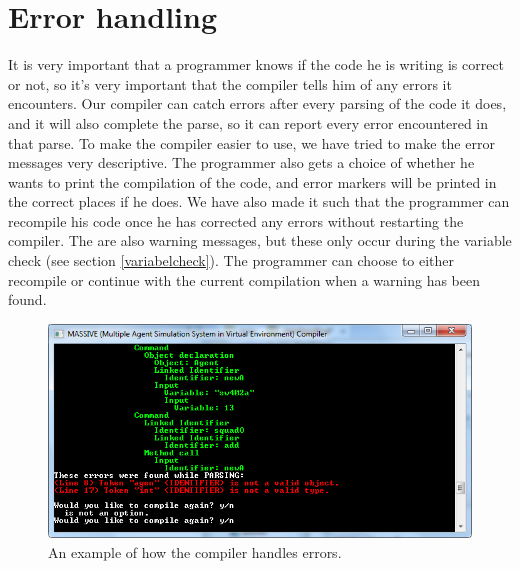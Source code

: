 \section{Error handling}
It is very important that a programmer knows if the code he is writing is correct or not, so it's very important that the compiler tells him of any errors it encounters. 
Our compiler can catch errors after every parsing of the code it does, and it will also complete the parse, so it can report every error encountered in that parse. \newline
To make the compiler easier to use, we have tried to make the error messages very descriptive. 
The programmer also gets a choice of whether he wants to print the compilation of the code, and error markers will be printed in the correct places if he does.
We have also made it such that the programmer can recompile his code once he has corrected any errors without restarting the compiler. \newline
The are also warning messages, but these only occur during the variable check (see section \ref{variabelcheck}). 
The programmer can choose to either recompile or continue with the current compilation when a warning has been found.

\begin{figure}[H]
\begin{center}
\includegraphics[scale=0.5]{Images/errorhandling.png}
\end{center}
\caption{An example of how the compiler handles errors.}
\end{figure}